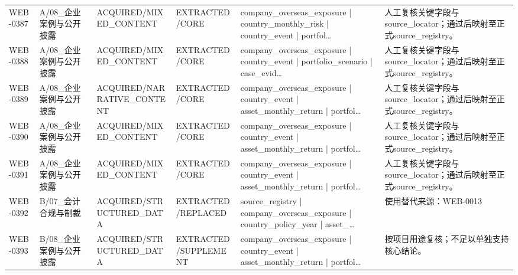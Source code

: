 \begin{landscape}
\begin{longtable}{p{1.8cm}p{2.6cm}p{2.6cm}p{2.6cm}p{4.8cm}p{7.2cm}}
WEB-0387 & A/\allowbreak{}08\_\allowbreak{}企业案例与公开披露 & ACQUIRED/\allowbreak{}MIXED\_\allowbreak{}CONTENT & EXTRACTED/\allowbreak{}CORE & company\_\allowbreak{}overseas\_\allowbreak{}exposure | country\_\allowbreak{}monthly\_\allowbreak{}risk | country\_\allowbreak{}event | portfol… & 人工复核关键字段与source\_\allowbreak{}locator；通过后映射至正式source\_\allowbreak{}registry。\\
WEB-0388 & A/\allowbreak{}08\_\allowbreak{}企业案例与公开披露 & ACQUIRED/\allowbreak{}MIXED\_\allowbreak{}CONTENT & EXTRACTED/\allowbreak{}CORE & company\_\allowbreak{}overseas\_\allowbreak{}exposure | country\_\allowbreak{}event | portfolio\_\allowbreak{}scenario | case\_\allowbreak{}evid… & 人工复核关键字段与source\_\allowbreak{}locator；通过后映射至正式source\_\allowbreak{}registry。\\
WEB-0389 & A/\allowbreak{}08\_\allowbreak{}企业案例与公开披露 & ACQUIRED/\allowbreak{}NARRATIVE\_\allowbreak{}CONTENT & EXTRACTED/\allowbreak{}CORE & company\_\allowbreak{}overseas\_\allowbreak{}exposure | country\_\allowbreak{}event | asset\_\allowbreak{}monthly\_\allowbreak{}return | portfol… & 人工复核关键字段与source\_\allowbreak{}locator；通过后映射至正式source\_\allowbreak{}registry。\\
WEB-0390 & A/\allowbreak{}08\_\allowbreak{}企业案例与公开披露 & ACQUIRED/\allowbreak{}MIXED\_\allowbreak{}CONTENT & EXTRACTED/\allowbreak{}CORE & company\_\allowbreak{}overseas\_\allowbreak{}exposure | country\_\allowbreak{}event | asset\_\allowbreak{}monthly\_\allowbreak{}return | portfol… & 人工复核关键字段与source\_\allowbreak{}locator；通过后映射至正式source\_\allowbreak{}registry。\\
WEB-0391 & A/\allowbreak{}08\_\allowbreak{}企业案例与公开披露 & ACQUIRED/\allowbreak{}MIXED\_\allowbreak{}CONTENT & EXTRACTED/\allowbreak{}CORE & company\_\allowbreak{}overseas\_\allowbreak{}exposure | country\_\allowbreak{}event | asset\_\allowbreak{}monthly\_\allowbreak{}return | portfol… & 人工复核关键字段与source\_\allowbreak{}locator；通过后映射至正式source\_\allowbreak{}registry。\\
WEB-0392 & B/\allowbreak{}07\_\allowbreak{}会计合规与制裁 & ACQUIRED/\allowbreak{}STRUCTURED\_\allowbreak{}DATA & EXTRACTED/\allowbreak{}REPLACED & source\_\allowbreak{}registry | company\_\allowbreak{}overseas\_\allowbreak{}exposure | country\_\allowbreak{}policy\_\allowbreak{}year | asset\_\allowbreak{}… & 使用替代来源：WEB-0013\\
WEB-0393 & B/\allowbreak{}08\_\allowbreak{}企业案例与公开披露 & ACQUIRED/\allowbreak{}STRUCTURED\_\allowbreak{}DATA & EXTRACTED/\allowbreak{}SUPPLEMENT & company\_\allowbreak{}overseas\_\allowbreak{}exposure | country\_\allowbreak{}event | asset\_\allowbreak{}monthly\_\allowbreak{}return | portfol… & 按项目用途复核；不足以单独支持核心结论。\\

\end{longtable}
\end{landscape}
